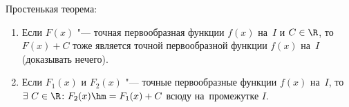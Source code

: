  Простенькая теорема:

  \begin{enumerate}
    \item Если $F(x)$ "--- точная первообразная функции $f(x)$ на~$I$ и $C\in\R$, то $F(x)+C$ тоже является точной первообразной функции $f(x)$ на~$I$ (доказывать нечего).

    \item Если $F_1(x)$ и $F_2(x)$ "--- точные первообразные функции $f(x)$ на~$I$, то $\exists\  C\in\R\colon F_2(x)\hm=F_1(x) + C$ всюду на~промежутке $I$.
  \end{enumerate}

